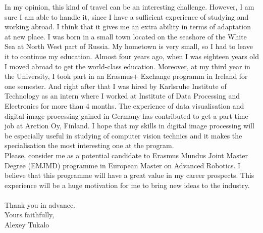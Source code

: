 \documentclass[english]{article}
\begin{document}
In my opinion, this kind of travel can be an interesting challenge. However, I am sure I am able to handle it, since I have a sufficient experience of studying and working abroad. I think that it gives me an extra ability in terms of adaptation at new place. I was born in a small town located on the seashore of the White Sea at North West part of Russia. My hometown is very small, so I had to leave it to continue my education. Almost four years ago, when I was eighteen years old I moved abroad to get the world-class education. Moreover, at my third year in the University, I took part in an Erasmus+ Exchange programm in Ireland for one semester. And right after that I was hired by Karlsruhe Institute of Technology as an intern where I worked at Institute of Data Processing and Electronics for more than 4 months. The experience of data visualisation and digital image processing gained in Germany has contributed to get a part time job at Arction Oy, Finland. I hope that my skills in digital image processing will be especially useful in studying of computer vision technics and it makes the specialisation the most interesting one at the program.\\

Please, consider me as a potential candidate to Erasmus Mundus Joint Master Degree (EMJMD) programme in European Master on Advanced Robotics. I believe that this programme will have a great value in my career prospects. This experience will be a huge motivation for me to bring new ideas to the industry.\\\\


Thank you in advance.\\
Yours faithfully,\\
Alexey Tukalo
    
\end{document}
